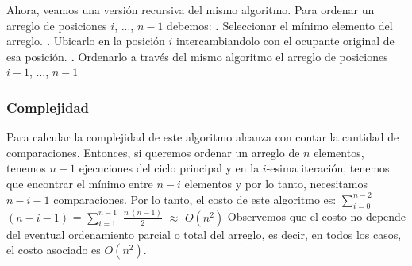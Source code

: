 \documentclass[10pt,a4paper]{article}
\begin{document}
\newline
\newline
Ahora, veamos una versión recursiva del mismo algoritmo.
\newline
\newline
Para ordenar un arreglo de posiciones $i$, ..., $n-1$ debemos:
\newline
\newline
\textbf{.} Seleccionar el mínimo elemento del arreglo.
\newline
\newline
\textbf{.} Ubicarlo en la posición $i$ intercambiandolo con el ocupante original de esa posición.
\newline
\newline
\textbf{.} Ordenarlo a través del mismo algoritmo el arreglo de posiciones $i+1$, ..., $n-1$
\newpage

\subsubsection{Complejidad}

Para calcular la complejidad de este algoritmo alcanza con contar la cantidad de comparaciones. 
\newline
\newline
Entonces, si queremos ordenar un arreglo de $n$ elementos, tenemos $n-1$ ejecuciones del ciclo principal y en la $i$-esima iteración, tenemos que encontrar el mínimo entre $n-i$ elementos y por lo tanto, necesitamos $n-i-1$ comparaciones.
\newline
\newline
Por lo tanto, el costo de este algoritmo es:
\newline
\newline
$\displaystyle \sum_{i=0}^{n-2}$ $(n-i-1)$ = $\displaystyle \sum_{i=1}^{n-1}$ $\displaystyle \frac{n~(n-1)}{2}$ $\approx$ $O(n^{2})$
\newline
\newline
\newline
Observemos que el costo no depende del eventual ordenamiento parcial o total del arreglo, es decir, en todos los casos, el costo asociado es $O(n^{2})$.
\end{document}
